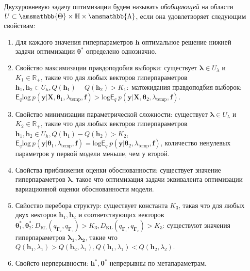 \begin{defin}
Двухуровневую задачу оптимизации будем называть \textit{обобщающей} на области $U \subset \amsmathbb{\Theta} \times \mathbb{H} \times \amsmathbb{\Lambda}$, если она удовлетворяет следующим свойствам:
\begin{enumerate}
\item Для каждого значения гиперпараметров $\mathbf{h}$ оптимальное решение нижней задачи оптимизации $\boldsymbol{\theta}^{*}$ определено однозначно.
\item Свойство максимизации правдоподобия выборки: существует $\boldsymbol{\lambda} \in U_{\lambda}$ и  $K_1 \in \mathbb{R}_{+}$, такие что для любых векторов гиперпараметров $\mathbf{h}_1, \mathbf{h}_2 \in  U_{h}, Q(\mathbf{h}_1) - Q(\mathbf{h}_2) > K_1:$ матожидания правдоподбия выборок: $\mathsf{E}_q \text{log}~p(\mathbf{y}|\mathbf{X}, \boldsymbol{\theta}_1, \lambda_{\text{temp}}, \mathbf{f})>\text{log}\mathsf{E}_q ~p(\mathbf{y}|\mathbf{X}, \boldsymbol{\theta}_2, \lambda_{\text{temp}}, \mathbf{f})$.
\item Свойство минимизации параметрической сложности:  существует  $\boldsymbol{\lambda} \in U_{\lambda}$ и $K_2 \in \mathbb{R}_{+}$, такие что для любых векторов гиперпараметров $\mathbf{h}_1, \mathbf{h}_2 \in U_h, Q(\mathbf{h}_1) - Q(\mathbf{h}_2) > K_2$,  $\mathsf{E}_q \text{log}~p(\mathbf{y}|\boldsymbol{\theta}_1, \lambda_{\text{temp}}, \mathbf{f}) = \text{log}\mathsf{E}_q ~p(\mathbf{y}|\boldsymbol{\theta}_2, \lambda_{\text{temp}}, \mathbf{f})$, количество ненулевых параметров у первой модели меньше, чем у второй.
\item Свойства приближения оценки обоснованности: существует значение гиперпараметров $\boldsymbol{\lambda}$, такое что оптимизация задачи эквивалента оптимизации вариационной оценки обоснованности модели.
\item Свйоство перебора структур: существует константа $K_3$, такая что для любых двух векторов $\mathbf{h}_{1}, \mathbf{h}_2$ и соответствующих векторов $\boldsymbol{\theta}_1^{*},\boldsymbol{\theta}_2^{*}: D_\text{KL}(q_{\boldsymbol{\Gamma}_2}, q_{\boldsymbol{\Gamma}_1})>K_3, D_\text{KL}(q_{\boldsymbol{\Gamma}_1}, q_{\boldsymbol{\Gamma}_2})>K_3$:  существуют значения гиперпараметров $\boldsymbol{\lambda_1},\boldsymbol{\lambda_2}$, такие что  $Q(\mathbf{h}_1, \lambda_1) > Q(\mathbf{h}_2, \lambda_1), Q(\mathbf{h}_1, \lambda_1) < Q(\mathbf{h}_2, \lambda_2)$.

\item Свойсто нерперывности: $\mathbf{h}^{*}, \boldsymbol{\theta}^{*}$ непрерывны по метапараметрам.
\end{enumerate}
\end{defin}
